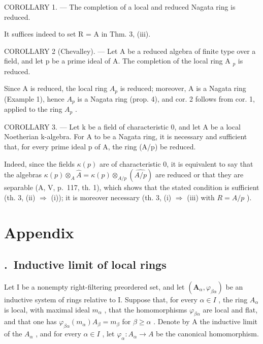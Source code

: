 COROLLARY 1. --- The completion of a local and reduced Nagata ring is reduced.

It suffices indeed to set R = A in Thm. 3, (iii).

COROLLARY 2 (Chevalley). --- Let A be a reduced algebra of finite type over a field, and let p be a prime ideal of A. The completion of the local ring A \(_{p}\) is reduced.

Since A is reduced, the local ring \(A_{p}\) is reduced; moreover, A is a Nagata ring (Example 1), hence \(A_{p}\) is a Nagata ring (prop. 4), and cor. 2 follows from cor. 1, applied to the ring \(A_{p}\) .

COROLLARY 3. --- Let k be a field of characteristic 0, and let A be a local Noetherian k-algebra. For A to be a Nagata ring, it is necessary and sufficient that, for every prime ideal p of A, the ring (A/p) be reduced.

Indeed, since the fields \(\kappa(p)\) are of characteristic 0, it is equivalent to say that the algebras \(\kappa(p) \otimes_{A} \hat{A} = \kappa(p) \otimes_{A/p} (\widehat{A/p})\) are reduced or that they are separable (A, V, p.~117, th. 1), which shows that the stated condition is sufficient (th. 3, (ii) \(\Rightarrow\) (i)); it is moreover necessary (th. 3, (i) \(\Rightarrow\) (iii) with \(R = A/p\) ).

\section*{Appendix}
{}

\subsection*{\theappendixitem.\ Inductive limit of local rings}
{}

Let I be a nonempty right-filtering preordered set, and let \((\mathbf{A}_{\alpha}, \varphi_{\beta\alpha})\) be an inductive system of rings relative to I. Suppose that, for every \(\alpha \in I\) , the ring \(A_{\alpha}\) is local, with maximal ideal \(m_{\alpha}\) , that the homomorphisms \(\varphi_{\beta\alpha}\) are local and flat, and that one has \(\varphi_{\beta\alpha}(m_{\alpha}) A_{\beta} = m_{\beta}\) for \(\beta \geqslant \alpha\) . Denote by A the inductive limit of the \(A_{\alpha}\) , and for every \(\alpha \in I\) , let \(\varphi_{\alpha}: A_{\alpha} \to A\) be the canonical homomorphism.

